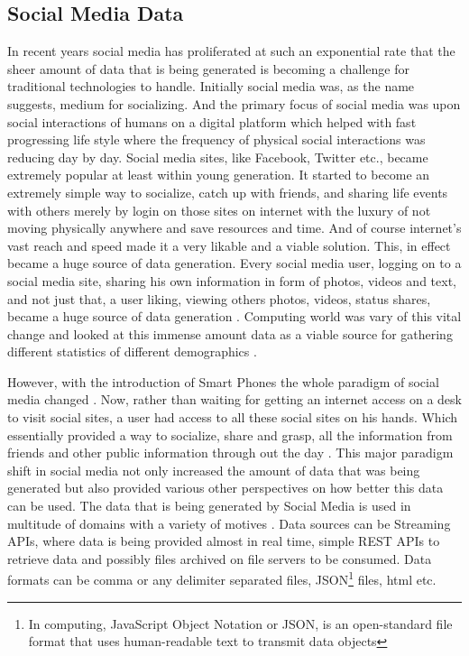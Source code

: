 \documentclass[sigconf]{acmart}
\begin{document}
\subsection{Social Media Data}

In recent years social media has proliferated at such an exponential rate that the sheer amount of data that is being generated is becoming a challenge for traditional technologies to handle. Initially social media was, as the name suggests, medium for socializing. And the primary focus of social media was upon social interactions of humans on a digital platform which helped with fast progressing life style where the frequency of physical social interactions was reducing day by day. Social media sites, like Facebook, Twitter etc., became extremely popular at least within young generation. It started to become an extremely simple way to socialize, catch up with friends, and sharing life events with others merely by login on those sites on internet with the luxury of not moving physically anywhere and save resources and time. And of course internet's vast reach and speed made it a very likable and a viable solution. This, in effect became a huge source of data generation. Every social media user, logging on to a social media site, sharing his own information in form of photos, videos and text, and not just that, a user liking, viewing others photos, videos, status shares, became a huge source of data generation \cite{fbstats}. Computing world was vary of this vital change and looked at this immense amount data as a viable source for gathering different statistics of different demographics \cite{bogdanphilip}.

However, with the introduction of Smart Phones the whole paradigm of social media changed \cite{CIER}. Now, rather than waiting for getting an internet access on a desk to visit social sites, a user had access to all these social sites on his hands. Which essentially provided a way to socialize, share and grasp, all the information from friends and other public information through out the day \cite{amandaphones}. This major paradigm shift in social media not only increased the amount of data that was being generated but also provided various other perspectives on how better this data can be used. The data that is being generated by Social Media is used in multitude of domains with a variety of motives \cite{ncsupost}. Data sources can be Streaming APIs, where data is being provided almost in real time, simple REST APIs to retrieve data and possibly files archived on file servers to be consumed. Data formats can be comma or any delimiter separated files, JSON\footnote{In computing, JavaScript Object Notation or JSON, is an open-standard file format that uses human-readable text to transmit data objects } files, html etc.
\end{document}
